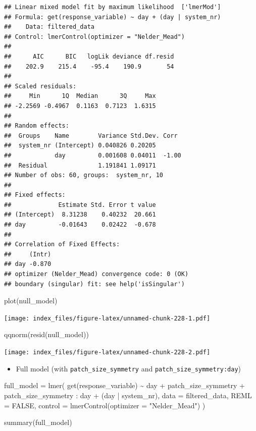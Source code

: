 \documentclass[
]{article}
\newenvironment{Shaded}{\begin{snugshade}}{\end{snugshade}}
\newcommand{\AttributeTok}[1]{\textcolor[rgb]{0.77,0.63,0.00}{#1}}
\newcommand{\ConstantTok}[1]{\textcolor[rgb]{0.00,0.00,0.00}{#1}}
\newcommand{\FunctionTok}[1]{\textcolor[rgb]{0.00,0.00,0.00}{#1}}
\newcommand{\NormalTok}[1]{#1}
\newcommand{\OtherTok}[1]{\textcolor[rgb]{0.56,0.35,0.01}{#1}}
\newcommand{\SpecialCharTok}[1]{\textcolor[rgb]{0.00,0.00,0.00}{#1}}
\newcommand{\StringTok}[1]{\textcolor[rgb]{0.31,0.60,0.02}{#1}}
\providecommand{\tightlist}{%
  \setlength{\itemsep}{0pt}\setlength{\parskip}{0pt}}
\begin{document}
\begin{verbatim}
## Linear mixed model fit by maximum likelihood  ['lmerMod']
## Formula: get(response_variable) ~ day + (day | system_nr)
##    Data: filtered_data
## Control: lmerControl(optimizer = "Nelder_Mead")
## 
##      AIC      BIC   logLik deviance df.resid 
##    202.9    215.4    -95.4    190.9       54 
## 
## Scaled residuals: 
##     Min      1Q  Median      3Q     Max 
## -2.2569 -0.4967  0.1163  0.7123  1.6315 
## 
## Random effects:
##  Groups    Name        Variance Std.Dev. Corr 
##  system_nr (Intercept) 0.040826 0.20205       
##            day         0.001608 0.04011  -1.00
##  Residual              1.191841 1.09171       
## Number of obs: 60, groups:  system_nr, 10
## 
## Fixed effects:
##             Estimate Std. Error t value
## (Intercept)  8.31238    0.40232  20.661
## day         -0.01643    0.02422  -0.678
## 
## Correlation of Fixed Effects:
##     (Intr)
## day -0.870
## optimizer (Nelder_Mead) convergence code: 0 (OK)
## boundary (singular) fit: see help('isSingular')
\end{verbatim}

\begin{Shaded}
\begin{Highlighting}[]
\FunctionTok{plot}\NormalTok{(null\_model)}
\end{Highlighting}
\end{Shaded}

\texttt{[image: index\_files/figure-latex/unnamed-chunk-228-1.pdf]}

\begin{Shaded}
\begin{Highlighting}[]
\FunctionTok{qqnorm}\NormalTok{(}\FunctionTok{resid}\NormalTok{(null\_model))}
\end{Highlighting}
\end{Shaded}

\texttt{[image: index\_files/figure-latex/unnamed-chunk-228-2.pdf]}

\begin{itemize}
\tightlist
\item
  Full model (with \texttt{patch\_size\_symmetry} and
  \texttt{patch\_size\_symmetry:day})
\end{itemize}

\begin{Shaded}
\begin{Highlighting}[]
\NormalTok{full\_model }\OtherTok{=} \FunctionTok{lmer}\NormalTok{(}
  \FunctionTok{get}\NormalTok{(response\_variable) }\SpecialCharTok{\textasciitilde{}}
\NormalTok{    day }\SpecialCharTok{+} 
\NormalTok{    patch\_size\_symmetry }\SpecialCharTok{+}
\NormalTok{    patch\_size\_symmetry }\SpecialCharTok{:}\NormalTok{ day }\SpecialCharTok{+} 
\NormalTok{    (day }\SpecialCharTok{|}\NormalTok{ system\_nr), }
  \AttributeTok{data =}\NormalTok{ filtered\_data,}
  \AttributeTok{REML =} \ConstantTok{FALSE}\NormalTok{,}
  \AttributeTok{control =} \FunctionTok{lmerControl}\NormalTok{(}\AttributeTok{optimizer =} \StringTok{"Nelder\_Mead"}\NormalTok{)}
\NormalTok{)}

\FunctionTok{summary}\NormalTok{(full\_model)}
\end{Highlighting}
\end{Shaded}
\end{document}
